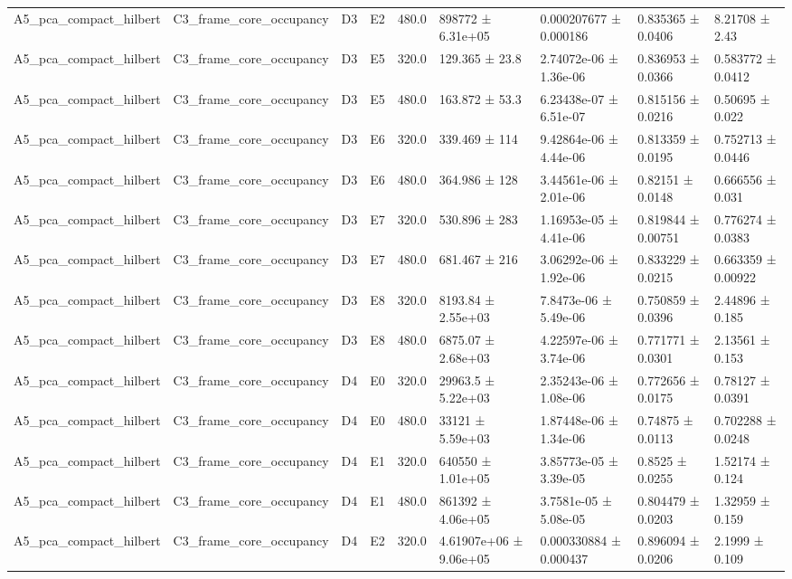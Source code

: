 \begin{table}
\begin{tabular}{lllllllll}
A5\_pca\_compact\_hilbert & C3\_frame\_core\_occupancy & D3 & E2 & 480.0 & 898772 ± 6.31e+05 & 0.000207677 ± 0.000186 & 0.835365 ± 0.0406 & 8.21708 ± 2.43 \\
A5\_pca\_compact\_hilbert & C3\_frame\_core\_occupancy & D3 & E5 & 320.0 & 129.365 ± 23.8 & 2.74072e-06 ± 1.36e-06 & 0.836953 ± 0.0366 & 0.583772 ± 0.0412 \\
A5\_pca\_compact\_hilbert & C3\_frame\_core\_occupancy & D3 & E5 & 480.0 & 163.872 ± 53.3 & 6.23438e-07 ± 6.51e-07 & 0.815156 ± 0.0216 & 0.50695 ± 0.022 \\
A5\_pca\_compact\_hilbert & C3\_frame\_core\_occupancy & D3 & E6 & 320.0 & 339.469 ± 114 & 9.42864e-06 ± 4.44e-06 & 0.813359 ± 0.0195 & 0.752713 ± 0.0446 \\
A5\_pca\_compact\_hilbert & C3\_frame\_core\_occupancy & D3 & E6 & 480.0 & 364.986 ± 128 & 3.44561e-06 ± 2.01e-06 & 0.82151 ± 0.0148 & 0.666556 ± 0.031 \\
A5\_pca\_compact\_hilbert & C3\_frame\_core\_occupancy & D3 & E7 & 320.0 & 530.896 ± 283 & 1.16953e-05 ± 4.41e-06 & 0.819844 ± 0.00751 & 0.776274 ± 0.0383 \\
A5\_pca\_compact\_hilbert & C3\_frame\_core\_occupancy & D3 & E7 & 480.0 & 681.467 ± 216 & 3.06292e-06 ± 1.92e-06 & 0.833229 ± 0.0215 & 0.663359 ± 0.00922 \\
A5\_pca\_compact\_hilbert & C3\_frame\_core\_occupancy & D3 & E8 & 320.0 & 8193.84 ± 2.55e+03 & 7.8473e-06 ± 5.49e-06 & 0.750859 ± 0.0396 & 2.44896 ± 0.185 \\
A5\_pca\_compact\_hilbert & C3\_frame\_core\_occupancy & D3 & E8 & 480.0 & 6875.07 ± 2.68e+03 & 4.22597e-06 ± 3.74e-06 & 0.771771 ± 0.0301 & 2.13561 ± 0.153 \\
A5\_pca\_compact\_hilbert & C3\_frame\_core\_occupancy & D4 & E0 & 320.0 & 29963.5 ± 5.22e+03 & 2.35243e-06 ± 1.08e-06 & 0.772656 ± 0.0175 & 0.78127 ± 0.0391 \\
A5\_pca\_compact\_hilbert & C3\_frame\_core\_occupancy & D4 & E0 & 480.0 & 33121 ± 5.59e+03 & 1.87448e-06 ± 1.34e-06 & 0.74875 ± 0.0113 & 0.702288 ± 0.0248 \\
A5\_pca\_compact\_hilbert & C3\_frame\_core\_occupancy & D4 & E1 & 320.0 & 640550 ± 1.01e+05 & 3.85773e-05 ± 3.39e-05 & 0.8525 ± 0.0255 & 1.52174 ± 0.124 \\
A5\_pca\_compact\_hilbert & C3\_frame\_core\_occupancy & D4 & E1 & 480.0 & 861392 ± 4.06e+05 & 3.7581e-05 ± 5.08e-05 & 0.804479 ± 0.0203 & 1.32959 ± 0.159 \\
A5\_pca\_compact\_hilbert & C3\_frame\_core\_occupancy & D4 & E2 & 320.0 & 4.61907e+06 ± 9.06e+05 & 0.000330884 ± 0.000437 & 0.896094 ± 0.0206 & 2.1999 ± 0.109 \\

\end{tabular}
\end{table}

